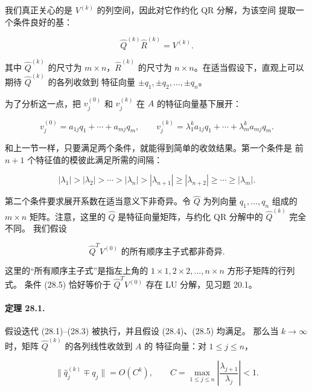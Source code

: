 \documentclass[UTF8,fontset=none,12pt]{ctexart}
\begin{document}
我们真正关心的是 $V^{(k)}$ 的列空间，因此对它作约化 QR 分解，为该空间
提取一个条件良好的基：

\begin{equation}
 \widehat Q^{(k)}\widehat R^{(k)}=V^{(k)}.
\tag{28.3}
\end{equation}

其中 $\widehat Q^{(k)}$ 的尺寸为 $m\times n$，$\widehat R^{(k)}$ 的尺寸为
$n\times n$。在适当假设下，直观上可以期待 $\widehat Q^{(k)}$ 的各列收敛到
特征向量 $\pm q_1,\pm q_2,\ldots,\pm q_n$。

为了分析这一点，把 $v_j^{(0)}$ 和 $v_j^{(k)}$ 在 $A$ 的特征向量基下展开：

\[
v_j^{(0)}=a_{1j}q_1+\cdots+a_{mj}q_m,
\qquad
v_j^{(k)}=\lambda_1^ka_{1j}q_1+\cdots+\lambda_m^ka_{mj}q_m.
\]

和上一节一样，只要满足两个条件，就能得到简单的收敛结果。第一个条件是
前 $n+1$ 个特征值的模彼此满足所需的间隔：

\begin{equation}
 |\lambda_1|>|\lambda_2|>\cdots>|\lambda_n|
 >|\lambda_{n+1}|\ge|\lambda_{n+2}|\ge\cdots\ge|\lambda_m|.
\tag{28.4}
\end{equation}

第二个条件要求展开系数在适当意义下非奇异。令 $\widehat Q$ 为列向量
$q_1,\ldots,q_n$ 组成的 $m\times n$ 矩阵。注意，这里的 $\widehat Q$
是特征向量矩阵，与约化 QR 分解中的 $\widehat Q^{(k)}$ 完全不同。
我们假设

\begin{equation}
 \widehat Q^TV^{(0)}\text{ 的所有顺序主子式都非奇异}.
\tag{28.5}
\end{equation}

这里的“所有顺序主子式”是指左上角的
$1\times1,2\times2,\ldots,n\times n$ 方形子矩阵的行列式。
条件 (28.5) 恰好等价于 $\widehat Q^TV^{(0)}$ 存在 LU 分解，见习题 20.1。

\paragraph{定理 28.1.}
假设迭代 (28.1)–(28.3) 被执行，并且假设 (28.4)、(28.5) 均满足。
那么当 $k\to\infty$ 时，矩阵 $\widehat Q^{(k)}$ 的各列线性收敛到 $A$ 的
特征向量：对 $1\le j\le n$，

\begin{equation}
 \|\widehat q_j^{(k)}\mp q_j\|=O(C^k),
 \qquad
 C=\max_{1\le j\le n}\left|\frac{\lambda_{j+1}}{\lambda_j}\right|<1.
\tag{28.6}
\end{equation}
\end{document}
